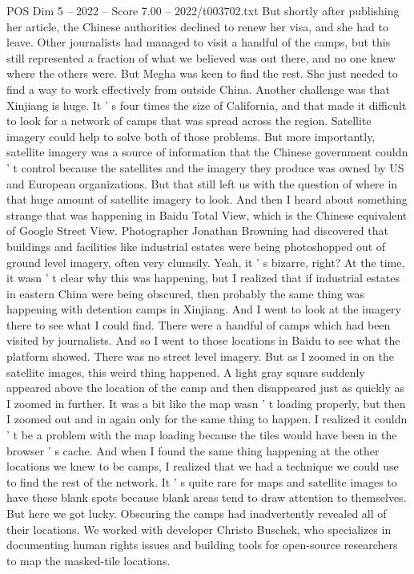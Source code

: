 \begin{textsample}{POS Dim 5 – 2022 – Score 7.00 – 2022/t003702.txt}
But shortly after publishing her article, the Chinese authorities declined to renew her visa, and she had to leave.
Other journalists had managed to visit a handful of the camps, but this still represented a fraction of what we believed was out there, and no one knew where the others were.
But Megha was keen to find the rest.
She just needed to find a way to work effectively from outside China.
Another challenge was that Xinjiang is huge.
It ' s four times the size of California, and that made it difficult to look for a network of camps that was spread across the region.
Satellite imagery could help to solve both of those problems.
But more importantly, satellite imagery was a source of information that the Chinese government couldn ' t control because the satellites and the imagery they produce was owned by US and European organizations.
But that still left us with the question of where in that huge amount of satellite imagery to look.
And then I heard about something strange that was happening in Baidu Total View, which is the Chinese equivalent of Google Street View.
Photographer Jonathan Browning had discovered that buildings and facilities like industrial estates were being photoshopped out of ground level imagery, often very clumsily.
Yeah, it ' s bizarre, right?
At the time, it wasn ' t clear why this was happening, but I realized that if industrial estates in eastern China were being obscured, then probably the same thing was happening with detention camps in Xinjiang.
And I went to look at the imagery there to see what I could find.
There were a handful of camps which had been visited by journalists.
And so I went to those locations in Baidu to see what the platform showed.
There was no street level imagery.
But as I zoomed in on the satellite images, this weird thing happened.
A light gray square suddenly appeared above the location of the camp and then disappeared just as quickly as I zoomed in further.
It was a bit like the map wasn ' t loading properly, but then I zoomed out and in again only for the same thing to happen.
I realized it couldn ' t be a problem with the map loading because the tiles would have been in the browser ' s cache.
And when I found the same thing happening at the other locations we knew to be camps, I realized that we had a technique we could use to find the rest of the network.
It ' s quite rare for maps and satellite images to have these blank spots because blank areas tend to draw attention to themselves.
But here we got lucky.
Obscuring the camps had inadvertently revealed all of their locations.
We worked with developer Christo Buschek, who specializes in documenting human rights issues and building tools for open-source researchers to map the masked-tile locations.

\end{textsample}
